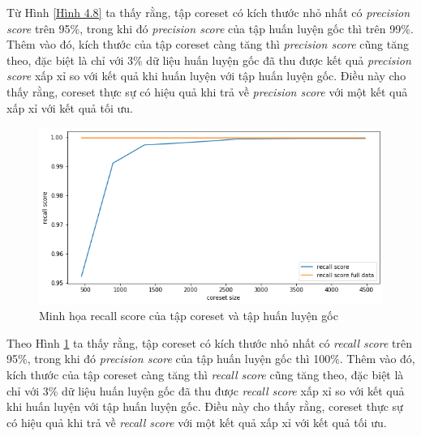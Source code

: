 \documentclass[a4paper, 12pt, oneside]{report}
\begin{document}
Từ Hình \ref{Hình 4.8} ta thấy rằng, tập coreset có kích thước nhỏ nhất có \textit{precision score} trên 95\%, trong khi đó \textit{precision score} của tập huấn luyện gốc thì trên 99\%. Thêm vào đó, kích thước của tập coreset càng tăng thì \textit{precision score} cũng tăng theo, đặc biệt là chỉ với 3\% dữ liệu huấn luyện gốc đã thu được kết quả \textit{precision score} xấp xỉ so với kết quả khi huấn luyện với tập huấn luyện gốc. Điều này cho thấy rằng, coreset thực sự có hiệu quả khi trả về \textit{precision score} với một kết quả xấp xỉ với kết quả tối ưu. 
\begin{center}
    \begin{figure}[H]
    \begin{center}
     \includegraphics[scale=0.4]{recall_skin.png}
    \end{center}
    \caption{Minh họa recall score của tập coreset và tập huấn luyện gốc}
    \label{Hình 4.9}
    \end{figure}
\end{center}
Theo Hình \ref{Hình 4.9} ta thấy rằng, tập coreset có kích thước nhỏ nhất có \textit{recall score} trên 95\%, trong khi đó \textit{precision score} của tập huấn luyện gốc thì 100\%. Thêm vào đó, kích thước của tập coreset càng tăng thì \textit{recall score} cũng tăng theo, đặc biệt là chỉ với 3\% dữ liệu huấn luyện gốc đã thu được \textit{recall score} xấp xỉ so với kết quả khi huấn luyện với tập huấn luyện gốc. Điều này cho thấy rằng, coreset thực sự có hiệu quả khi trả về \textit{recall score} với một kết quả xấp xỉ với kết quả tối ưu. 
\end{document}
